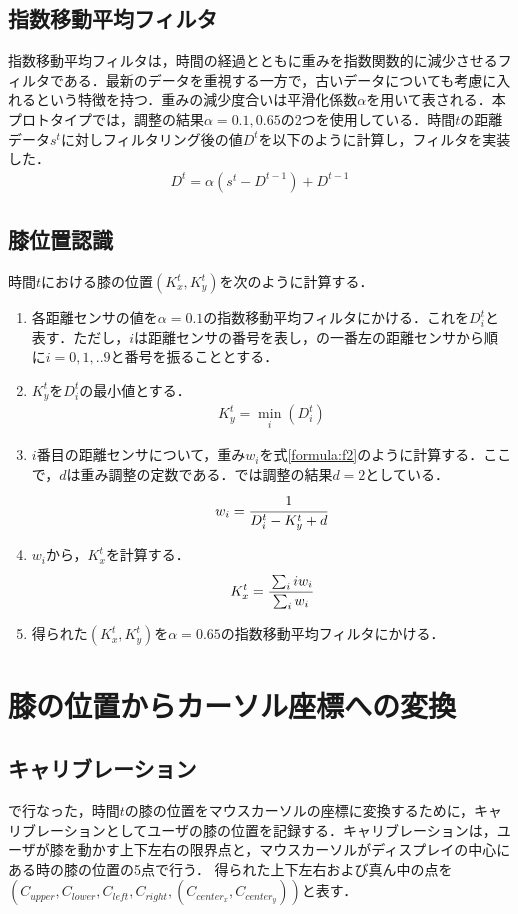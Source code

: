 \subsection{指数移動平均フィルタ}
指数移動平均フィルタは，時間の経過とともに重みを指数関数的に減少させるフィルタである．最新のデータを重視する一方で，古いデータについても考慮に入れるという特徴を持つ．重みの減少度合いは平滑化係数$\alpha$を用いて表される．本プロトタイプでは，調整の結果$\alpha = 0.1, 0.65$の2つを使用している．時間$t$の距離データ$s^t$に対しフィルタリング後の値$D^t$を以下のように計算し，フィルタを実装した．
\begin{eqnarray}
	D^t = \alpha (s^t - D^{t-1}) + D^{t-1}
\end{eqnarray}
\subsection{膝位置認識}
時間$t$における膝の位置$(K^t_x, K^t_y)$を次のように計算する．
\begin{enumerate}
	\item 各距離センサの値を$\alpha=0.1$の指数移動平均フィルタにかける．これを$D^t_i$と表す．ただし，$i$は距離センサの番号を表し，の一番左の距離センサから順に$i=0,1,..9$と番号を振ることとする．
	\item $K^t_y$を$D^t_i $の最小値とする．
		\begin{eqnarray}
		 	K^t_y = \min_i(D^t_i)
		 	\label{formula:f1}
		\end{eqnarray}
	\item $i$番目の距離センサについて，重み$w_i$を式\ref{formula:f2}のように計算する．ここで，$d$は重み調整の定数である．\SysName では調整の結果$d=2$としている．
		\begin{eqnarray}
			w_i = \cfrac{1}{D^t_i - K^t_y + d}
		\label{formula:f2}
	\end{eqnarray}
	\item $w_i$から，$K^t_x$を計算する．
		\begin{eqnarray}
		 	 K^t_x=\cfrac{\sum_i iw_i}{\sum_i w_i}
		 	\label{formula:f3}
		\end{eqnarray} 
	\item 得られた$(K^t_x, K^t_y)$を$\alpha=0.65$の指数移動平均フィルタにかける．
\end{enumerate}
\section{膝の位置からカーソル座標への変換}
\subsection{キャリブレーション}
で行なった，時間$t$の膝の位置をマウスカーソルの座標に変換するために，キャリブレーションとしてユーザの膝の位置を記録する．キャリブレーションは，ユーザが膝を動かす上下左右の限界点と，マウスカーソルがディスプレイの中心にある時の膝の位置の5点で行う．
得られた上下左右および真ん中の点を$(C_{upper}, C_{lower}, C_{left}, C_{right}, (C_{center_x}, C_{center_y}))$と表す．
